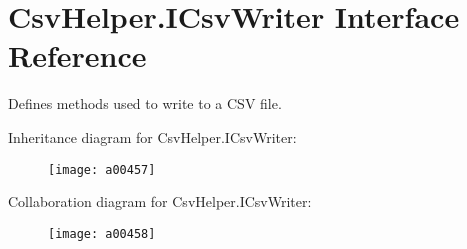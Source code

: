\hypertarget{a00111}{\section{Csv\-Helper.\-I\-Csv\-Writer Interface Reference}
\label{a00111}
}


Defines methods used to write to a C\-S\-V file.  




Inheritance diagram for Csv\-Helper.\-I\-Csv\-Writer\-:
\nopagebreak
\begin{figure}[H]
\begin{center}
\leavevmode
\texttt{[image: a00457]}
\end{center}
\end{figure}


Collaboration diagram for Csv\-Helper.\-I\-Csv\-Writer\-:
\nopagebreak
\begin{figure}[H]
\begin{center}
\leavevmode
\texttt{[image: a00458]}
\end{center}
\end{figure}
